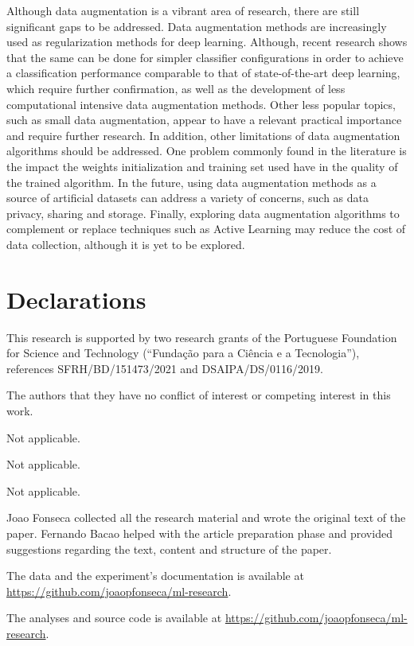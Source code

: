 \documentclass[pdflatex,sn-mathphys]{sn-jnl}%
\theoremstyle{thmstyleone}
\theoremstyle{thmstyletwo}
\theoremstyle{thmstylethree}
\begin{document}
Although data augmentation is a vibrant area of research, there are still
significant gaps to be addressed. Data augmentation methods are increasingly
used as regularization methods for deep learning. Although, recent research
shows that the same can be done for simpler classifier configurations in order
to achieve a classification performance comparable to that of state-of-the-art
deep learning, which require further confirmation, as well as the development
of less computational intensive data augmentation methods. Other less popular
topics, such as small data augmentation, appear to have a relevant practical
importance and require further research. In addition, other limitations of
data augmentation algorithms should be addressed. One problem commonly found
in the literature is the impact the weights initialization and training set
used have in the quality of the trained algorithm. In the future, using data
augmentation methods as a source of artificial datasets can address a variety
of concerns, such as data privacy, sharing and storage. Finally, exploring
data augmentation algorithms to complement or replace techniques such as
Active Learning may reduce the cost of data collection, although it is yet to
be explored.

\backmatter%

\section*{Declarations}


This research is supported by two research grants of the Portuguese Foundation
for Science and Technology (``Fundação para a Ciência e a Tecnologia''),
references SFRH/BD/151473/2021 and DSAIPA/DS/0116/2019.


The authors that they have no conflict of interest or competing interest in
this work.


Not applicable.


Not applicable.


Not applicable.


Joao Fonseca collected all the research material and wrote the original text
of the paper. Fernando Bacao helped with the article preparation phase and
provided suggestions regarding the text, content and structure of the paper.


The data and the experiment's documentation is available at
\href{https://github.com/joaopfonseca/ml-research}{https://github.com/joaopfonseca/ml-research}.


The analyses and source code is available at
\href{https://github.com/joaopfonseca/ml-research}{https://github.com/joaopfonseca/ml-research}.


\end{document}
